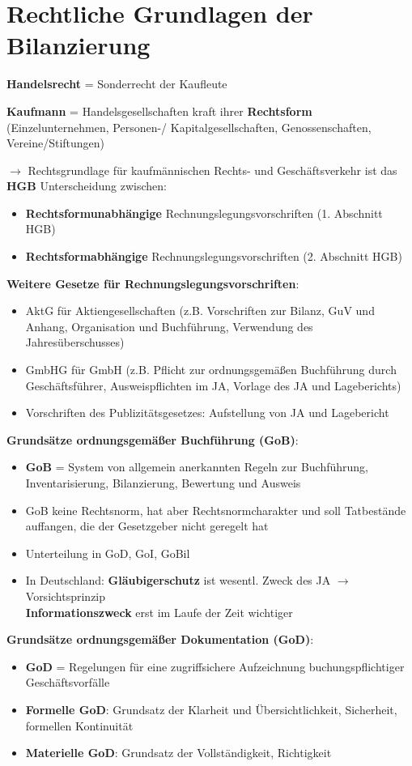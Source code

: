 \section{Rechtliche Grundlagen der Bilanzierung}

\textbf{Handelsrecht} = Sonderrecht der Kaufleute

\textbf{Kaufmann} = Handelsgesellschaften kraft ihrer \textbf{Rechtsform} (Einzelunternehmen, Personen-/ Kapitalgesellschaften, Genossenschaften, Vereine/Stiftungen)

$\rightarrow$ Rechtsgrundlage für kaufmännischen Rechts- und Geschäftsverkehr ist das \textbf{HGB}
Unterscheidung zwischen:
\begin{itemize}
	\item \textbf{Rechtsformunabhängige} Rechnungslegungsvorschriften (1. Abschnitt HGB)
	\item \textbf{Rechtsformabhängige} Rechnungslegungsvorschriften (2. Abschnitt HGB)
\end{itemize}
\textbf{Weitere Gesetze für Rechnungslegungsvorschriften}:
\begin{itemize}
	\item AktG für Aktiengesellschaften (z.B. Vorschriften zur Bilanz, GuV und Anhang, Organisation und Buchführung, Verwendung des Jahresüberschusses)
	\item GmbHG für GmbH (z.B. Pflicht zur ordnungsgemäßen Buchführung durch
	Geschäftsführer, Ausweispflichten im JA, Vorlage des JA und Lageberichts)
	\item Vorschriften des Publizitätsgesetzes: Aufstellung von JA und Lagebericht
\end{itemize}
\bigskip
\textbf{Grundsätze ordnungsgemäßer Buchführung (GoB)}: 
\begin{itemize}
	\item \textbf{GoB} = System von allgemein anerkannten Regeln zur Buchführung, Inventarisierung, Bilanzierung, Bewertung und Ausweis
	\item GoB keine Rechtsnorm, hat aber Rechtsnormcharakter und soll Tatbestände auffangen, die der Gesetzgeber nicht geregelt hat
	\item Unterteilung in GoD, GoI, GoBil
	\item In Deutschland: \textbf{Gläubigerschutz} ist wesentl. Zweck des JA $\rightarrow$ Vorsichtsprinzip\\
	\textbf{Informationszweck} erst im Laufe der Zeit wichtiger
\end{itemize}

\textbf{Grundsätze ordnungsgemäßer Dokumentation (GoD)}:
\begin{itemize}
	\item \textbf{GoD} = Regelungen für eine zugriffsichere Aufzeichnung buchungspflichtiger Geschäftsvorfälle
	\item \textbf{Formelle GoD}: Grundsatz der Klarheit und Übersichtlichkeit, Sicherheit, formellen Kontinuität
	\item \textbf{Materielle GoD}: Grundsatz der Vollständigkeit, Richtigkeit
\end{itemize}

